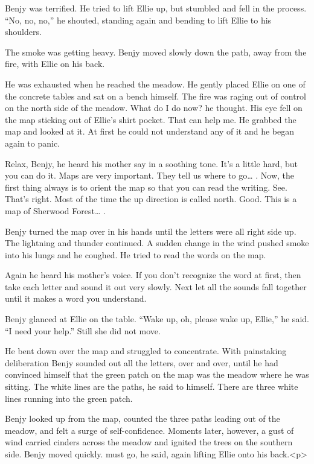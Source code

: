 \documentclass[]{article}
\begin{document}
{Benjy was terrified. He tried to lift Ellie up, but stumbled and fell in the process. “No, no, no,” he shouted, standing again and bending to lift Ellie to his shoulders.

The smoke was getting heavy. Benjy moved slowly down the path, away from the fire, with Ellie on his back.

He was exhausted when he reached the meadow. He gently placed Ellie on one of the concrete tables and sat on a bench himself. The fire was raging out of control on the north side of the meadow. What do I do now? he thought. His eye fell on the map sticking out of Ellie’s shirt pocket. That can help me. He grabbed the map and looked at it. At first he could not understand any of it and he began again to panic.

Relax, Benjy, he heard his mother say in a soothing tone. It’s a little hard, but you can do it. Maps are very important. They tell us where to go… . Now, the first thing always is to orient the map so that you can read the writing. See. That’s right. Most of the time the up direction is called north. Good. This is a map of Sherwood Forest… .

Benjy turned the map over in his hands until the letters were all right side up. The lightning and thunder continued. A sudden change in the wind pushed smoke into his lungs and he coughed. He tried to read the words on the map.

Again he heard his mother’s voice. If you don’t recognize the word at first, then take each letter and sound it out very slowly. Next let all the sounds fall together until it makes a word you understand.

Benjy glanced at Ellie on the table. “Wake up, oh, please wake up, Ellie,” he said. “I need your help.” Still she did not move.

He bent down over the map and struggled to concentrate. With painstaking deliberation Benjy sounded out all the letters, over and over, until he had convinced himself that the green patch on the map was the meadow where he was sitting. The white lines are the paths, he said to himself. There are three white lines running into the green patch.

Benjy looked up from the map, counted the three paths leading out of the meadow, and felt a surge of self-confidence. Moments later, however, a gust of wind carried cinders across the meadow and ignited the trees on the southern side. Benjy moved quickly. must go, he said, again lifting Ellie onto his back.<p>

}
\end{document}
